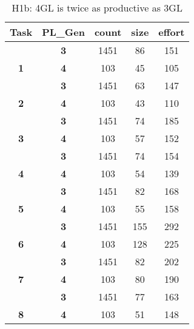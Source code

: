 

\begin{table}

\scriptsize
\renewcommand{\baselinestretch}{0.5} 

\centering
\caption{H1b: 4GL is twice as productive as 3GL}
\label{tab:h1b}
\begin{tabular}{|c|c|c|c|c|}
\hline
\textbf{Task} & \textbf{PL\_Gen} & \textbf{count} & \textbf{size} & \textbf{effort} \\ \hline
 & \textbf{3} & 1451 & 86 & 151 \\ \cline{2-5} 
\multirow{-2}{*}{\textbf{1}} & \textbf{4} & 103 & \cellcolor[HTML]{C0C0C0}45 & \cellcolor[HTML]{C0C0C0}105 \\ \hline
 & \textbf{3} & 1451 & 63 & 147 \\ \cline{2-5} 
\multirow{-2}{*}{\textbf{2}} & \textbf{4} & 103 & \cellcolor[HTML]{C0C0C0}43 & \cellcolor[HTML]{C0C0C0}110 \\ \hline
 & \textbf{3} & 1451 & 74 & 185 \\ \cline{2-5} 
\multirow{-2}{*}{\textbf{3}} & \textbf{4} & 103 & \cellcolor[HTML]{C0C0C0}57 & \cellcolor[HTML]{C0C0C0}152 \\ \hline
 & \textbf{3} & 1451 & 74 & \cellcolor[HTML]{C0C0C0}154 \\ \cline{2-5} 
\multirow{-2}{*}{\textbf{4}} & \textbf{4} & 103 & \cellcolor[HTML]{C0C0C0}54 & \cellcolor[HTML]{C0C0C0}139 \\ \hline
 & \textbf{3} & 1451 & 82 & \cellcolor[HTML]{C0C0C0}168 \\ \cline{2-5} 
\multirow{-2}{*}{\textbf{5}} & \textbf{4} & 103 & \cellcolor[HTML]{C0C0C0}55 & \cellcolor[HTML]{C0C0C0}158 \\ \hline
 & \textbf{3} & 1451 & 155 & 292 \\ \cline{2-5} 
\multirow{-2}{*}{\textbf{6}} & \textbf{4} & 103 & \cellcolor[HTML]{C0C0C0}128 & \cellcolor[HTML]{C0C0C0}225 \\ \hline
 & \textbf{3} & 1451 & \cellcolor[HTML]{C0C0C0}82 & \cellcolor[HTML]{C0C0C0}202 \\ \cline{2-5} 
\multirow{-2}{*}{\textbf{7}} & \textbf{4} & 103 & \cellcolor[HTML]{C0C0C0}80 & \cellcolor[HTML]{C0C0C0}190 \\ \hline
 & \textbf{3} & 1451 & 77 & \cellcolor[HTML]{C0C0C0}163 \\ \cline{2-5} 
\multirow{-2}{*}{\textbf{8}} & \textbf{4} & 103 & \cellcolor[HTML]{C0C0C0}51 & \cellcolor[HTML]{C0C0C0}148 \\ \hline

\end{tabular}
\end{table}
